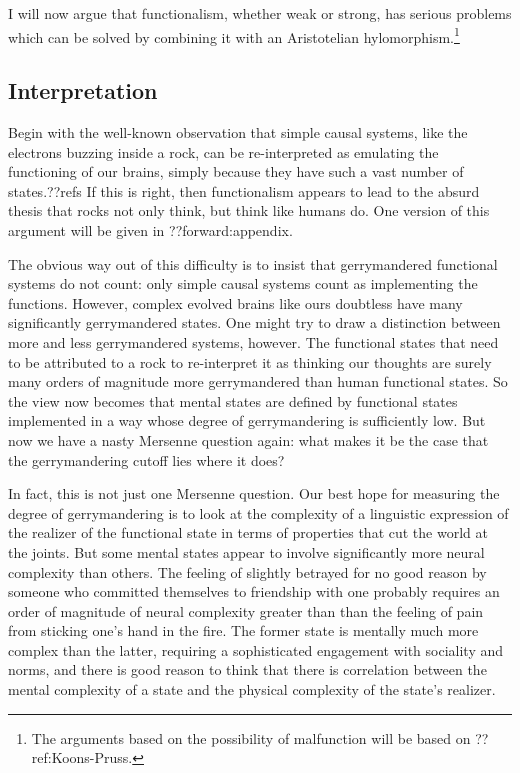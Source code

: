 I will now argue that functionalism, whether weak or strong, has serious problems which can be solved by combining it with an Aristotelian hylomorphism.\footnote{The arguments
based on the possibility of malfunction will be based on ??ref:Koons-Pruss.} 

\subsection{Interpretation}
Begin with the well-known observation that simple causal systems, like the electrons buzzing inside a rock, can be re-interpreted as 
emulating the functioning of our brains, simply because they have such a vast number of states.??refs If this is right, then functionalism 
appears to lead to the absurd thesis that rocks not only think, but think like humans do. One version of this argument will be given in ??forward:appendix. 

The obvious way out of this difficulty is to insist that gerrymandered functional systems do not count: only simple causal
systems count as implementing the functions. However, complex evolved brains like ours doubtless have many  significantly
gerrymandered states. One might try to draw a distinction between more and less gerrymandered systems, however. The functional states 
that need to be attributed to a rock to re-interpret it as thinking our thoughts are surely many orders of magnitude more gerrymandered
than human functional states. So the view now becomes that mental states are defined by functional states implemented
in a way whose degree of gerrymandering is sufficiently low.  But now we have a nasty Mersenne question again: 
what makes it be the case that the gerrymandering cutoff lies where it does?

In fact, this is not just one Mersenne question. Our best hope for measuring the degree of gerrymandering is to
look at the complexity of a linguistic expression of the realizer of the functional state in terms of properties that cut
the world at the joints. But some mental states appear to involve significantly more neural complexity than others.
The feeling of slightly betrayed for no good reason by someone who committed themselves to friendship with one 
probably requires an order of magnitude of neural complexity greater than than the feeling of pain from sticking
one's hand in the fire. The former state is mentally much more complex than the latter, requiring a sophisticated
engagement with sociality and norms, and there is good reason to think that there is correlation between the mental
complexity of a state and the physical complexity of the state's realizer. 

